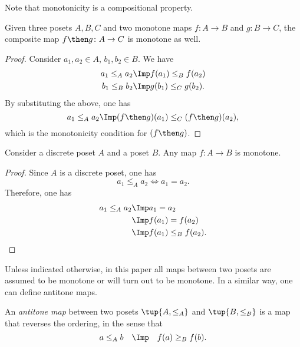 \noindent Note that monotonicity is a compositional property.

\begin{lemma}Given three posets $A, B, C$ and two monotone maps $f\colon A
\to B$ and  $g\colon B \to C$, the composite map $f\then g\colon  A \to C$ is
monotone as well.
\end{lemma}
\begin{proof}
Consider $a_1,a_2 \in A$, $b_1,b_2\in B$. We have 
\begin{equation}
\begin{aligned}
        a_1\leq_A a_2 &\Imp f(a_1)\leq_B f(a_2)\\ 
        b_1\leq_B b_2 &\Imp g(b_1)\leq_C g(b_2).
\end{aligned}
\end{equation}
By substituting the above, one has
\begin{equation}
    a_1\leq_A a_2 \Imp (f\then g)(a_1) \leq_C (f\then g)(a_2),
\end{equation}
which is the monotonicity condition for $(f\then g)$.
\end{proof}

\begin{lemma}
Consider a discrete poset $A$ and a poset $B$. Any map $f\colon A\to B$ is monotone.
\end{lemma}
\begin{proof}
Since $A$ is a discrete poset, one has
\begin{equation}
    a_1\leq_A a_2 \iff a_1=a_2.
\end{equation}
Therefore, one has
\begin{equation}
\begin{aligned}
    a_1\leq_A a_2 &\Imp a_1=a_2\\
    &\Imp f(a_1)=f(a_2)\\
    &\Imp f(a_1)\leq_B f(a_2).
\end{aligned}
\end{equation}
\end{proof}
Unless indicated otherwise, in this paper all maps between two posets
are assumed to be monotone or will turn out to be monotone. In a similar way, one can define antitone maps.
\begin{definition}
An \emph{antitone map} between two posets
$\tup{A, \leq_A}$ and $\tup{B, \leq_B}$ is a map that reverses the ordering, in the sense that 
\begin{equation}
 a \leq_A b \quad \Imp \quad f(a) \geq_B f(b).
\end{equation}
\end{definition}

